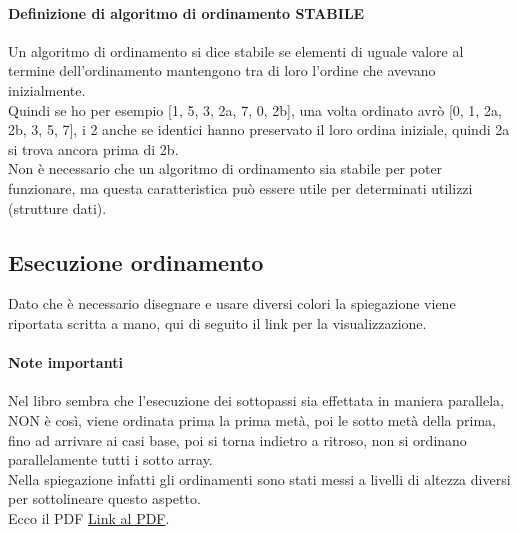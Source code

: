 \paragraph*{Definizione di algoritmo di ordinamento STABILE}
Un algoritmo di ordinamento si dice stabile se elementi di uguale valore al termine dell'ordinamento 
mantengono tra di loro l'ordine che avevano inizialmente.\\
Quindi se ho per esempio [1, 5, 3, 2a, 7, 0, 2b], una volta ordinato
avrò [0, 1, 2a, 2b, 3, 5, 7], i 2 anche se identici hanno preservato il loro ordina iniziale, quindi
2a si trova ancora prima di 2b.\\
Non è necessario che un algoritmo di ordinamento sia stabile per poter funzionare, ma questa 
caratteristica può essere utile per determinati utilizzi (strutture dati).
\subsection{Esecuzione ordinamento}
Dato che è necessario disegnare e usare diversi colori la spiegazione viene
riportata scritta a mano, qui di seguito il link per la visualizzazione.
\paragraph*{Note importanti} Nel libro sembra che l'esecuzione dei sottopassi sia effettata in maniera
parallela, NON è così, viene ordinata prima la prima metà, poi le sotto metà della prima, fino ad arrivare ai casi base,
poi si torna indietro a ritroso, non si ordinano parallelamente tutti i sotto array.\\
Nella spiegazione infatti gli ordinamenti sono stati messi a livelli di altezza diversi per sottolineare
questo aspetto.\\
Ecco il PDF \href{https://drive.google.com/file/d/1Ne8wRM-v0vQZlO_I1bBfiiJK-7Co7vqX/view?usp=sharing}{Link al PDF}.
